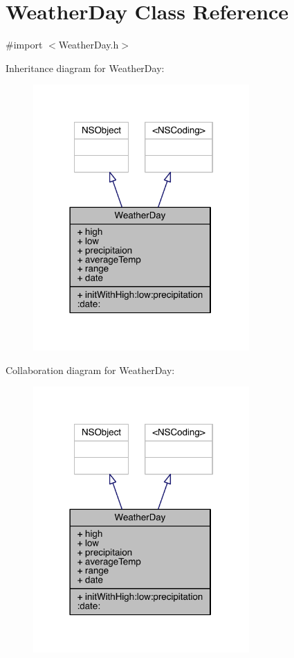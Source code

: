 \hypertarget{interface_weather_day}{\section{Weather\-Day Class Reference}
\label{interface_weather_day}
}


{\ttfamily \#import $<$Weather\-Day.\-h$>$}



Inheritance diagram for Weather\-Day\-:\nopagebreak
\begin{figure}[H]
\begin{center}
\leavevmode
\includegraphics[width=234pt]{interface_weather_day__inherit__graph}
\end{center}
\end{figure}


Collaboration diagram for Weather\-Day\-:\nopagebreak
\begin{figure}[H]
\begin{center}
\leavevmode
\includegraphics[width=234pt]{interface_weather_day__coll__graph}
\end{center}
\end{figure}
